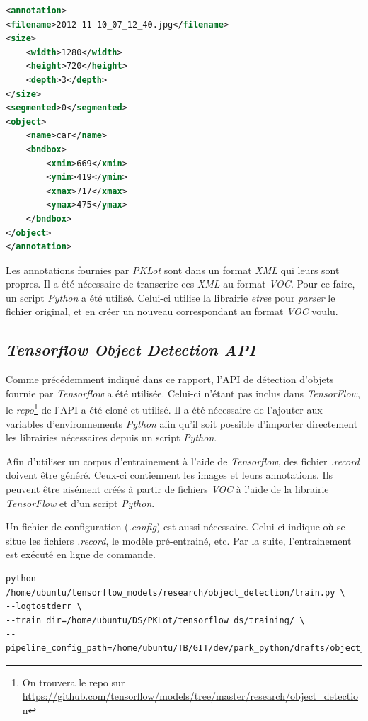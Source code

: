\begin{lstlisting}[caption={Exemple de fichier \textit{VOC}}, label={lst:voc}, language=XML] 
<annotation>
<filename>2012-11-10_07_12_40.jpg</filename>
<size>
    <width>1280</width>   
    <height>720</height>
    <depth>3</depth>
</size>
<segmented>0</segmented>
<object>
    <name>car</name>
    <bndbox>
        <xmin>669</xmin>
        <ymin>419</ymin>
        <xmax>717</xmax>
        <ymax>475</ymax>
    </bndbox>
</object>
</annotation>
\end{lstlisting}

Les annotations fournies par \textit{PKLot} sont dans un format \textit{XML} qui leurs sont propres. Il a été nécessaire de transcrire ces \textit{XML} au format \textit{VOC}. Pour ce faire, un script \textit{Python} a été utilisé. Celui-ci utilise la librairie \textit{etree} pour \textit{parser} le fichier original, et en créer un nouveau correspondant au format \textit{VOC} voulu. 

\subsection{\textit{Tensorflow Object Detection API}}
Comme précédemment indiqué dans ce rapport, l'API de détection d'objets fournie par \textit{Tensorflow} a été utilisée. Celui-ci n'étant pas inclus dans \textit{TensorFlow}, le \textit{repo}\footnote{On trouvera le repo sur \url{https://github.com/tensorflow/models/tree/master/research/object_detection}} de l'API a été cloné et utilisé. Il a été nécessaire de l'ajouter aux variables d'environnements \textit{Python} afin qu'il soit possible d'importer directement les librairies nécessaires depuis un script \textit{Python}.

Afin d'utiliser un corpus d'entrainement à l'aide de \textit{Tensorflow}, des fichier \textit{.record} doivent être généré. Ceux-ci contiennent les images et leurs annotations. Ils peuvent être aisément créés à partir de fichiers \textit{VOC} à l'aide de la librairie \textit{TensorFlow} et d'un script \textit{Python}. 

Un fichier de configuration (\textit{.config}) est aussi nécessaire. Celui-ci indique où se situe les fichiers \textit{.record}, le modèle pré-entrainé, etc. Par la suite, l'entrainement est exécuté en ligne de commande.

\begin{lstlisting}[caption={Exécution d'un entrainement à l'aide de \textit{Tensorflow Object Detection API}}, label={lst:voc}, numbers=none] 
python /home/ubuntu/tensorflow_models/research/object_detection/train.py \
--logtostderr \
--train_dir=/home/ubuntu/DS/PKLot/tensorflow_ds/training/ \
--pipeline_config_path=/home/ubuntu/TB/GIT/dev/park_python/drafts/object_detection/tensorflow_api_pklot/training.config
\end{lstlisting}

